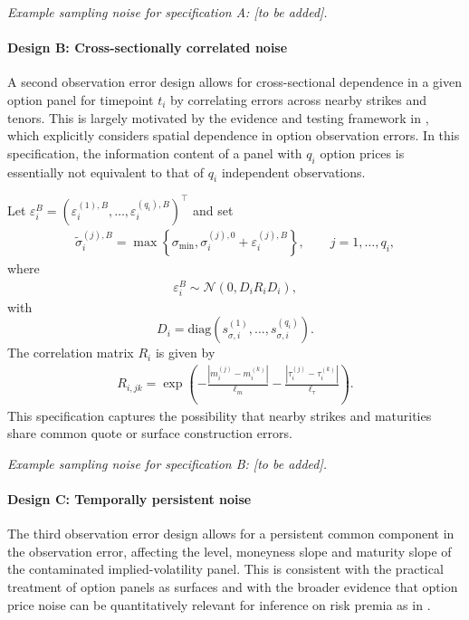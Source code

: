 \documentclass[11pt,a4paper,notitlepage]{article}
\numberwithin{equation}{section}
\begin{document}
\emph{Example sampling noise for specification A: [to be added].}

\paragraph{Design B: Cross-sectionally correlated noise}
A second observation error design allows for cross-sectional dependence in a given option panel for timepoint $t_i$ by correlating errors across nearby strikes and tenors. This is largely motivated by the evidence and testing framework in \cite{andersen2021spatial}, which explicitly considers spatial dependence in option observation errors. In this specification, the information content of a panel with $q_i$ option prices is essentially not equivalent to that of $q_i$ independent observations.

Let
$\varepsilon_i^B=\left(\varepsilon_i^{(1),B},\ldots,\varepsilon_i^{(q_i),B}\right)^\top$ and set
\begin{align}
\tilde\sigma_i^{(j),B}
=
\max\left\{
\sigma_{\min},
\sigma_i^{(j),0}
+
\varepsilon_i^{(j),B}
\right\},
\qquad
j=1,\ldots,q_i,
\label{eq:noise_spatial_iv}
\end{align}
where
\begin{align}
\varepsilon_i^B\sim\mathcal{N}(0,D_i R_i D_i),
\label{eq:noise_spatial}
\end{align}
with
\[
D_i=\mathrm{diag}\left(s_{\sigma,i}^{(1)},\ldots,s_{\sigma,i}^{(q_i)}\right).
\]
The correlation matrix $R_i$ is given by
\begin{align}
R_{i,jk}
=
\exp\left(
-\frac{|m_i^{(j)}-m_i^{(k)}|}{\ell_m}
-\frac{|\tau_i^{(j)}-\tau_i^{(k)}|}{\ell_\tau}
\right).
\label{eq:spatial_kernel}
\end{align}
This specification captures the possibility that nearby strikes and maturities share common quote or surface construction errors.

\emph{Example sampling noise for specification B: [to be added].}

\paragraph{Design C: Temporally persistent noise}
The third observation error design allows for a persistent common component in the observation error, affecting the level, moneyness slope and maturity slope of the contaminated implied-volatility panel. This is consistent with the practical treatment of option panels as surfaces and with the broader evidence that option price noise can be quantitatively relevant for inference on risk premia as in \cite{duarte2024very}.
\end{document}
